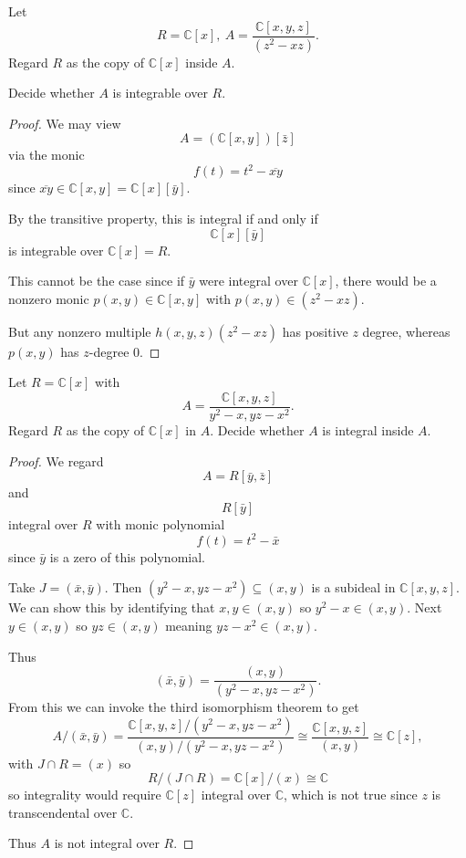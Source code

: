 \documentclass[11pt]{article}
\begin{document}
\begin{prob}
    Let 
    \[
        R = \mathbb C[x], \ A = 
        \frac{\mathbb C[x,y,z]}{(z^2-xz)}. 
    \]
    Regard $R$ as the copy of $\mathbb C[x]$ inside $A$. 
    
    Decide whether $A$ is integrable over $R$. 
\end{prob}
\begin{proof}
    We may view 
    \[
        A = (\mathbb C[x,y])[\bar z]
    \]
    via the monic 
    \[
        f(t) = t^2 - \overline{xy}
    \]
    since $\overline{xy} 
    \in \mathbb C[x,y] = \mathbb C[x][\bar y]$.
    
    By the transitive property, this is integral if 
    and only if 
    \[
        \mathbb C[x][\bar y] 
    \]
    is integrable over $\mathbb C[x] = R$. 

    This cannot be the case since if $\bar y$ 
    were integral over $\mathbb C[x]$, 
    there would be a nonzero monic $p(x,y) \in 
    \mathbb C[x,y]$ with 
    $p(x,y) \in (z^2 - xz)$. 

    But any nonzero multiple $h(x,y,z)(z^2-xz)$ 
    has positive $z$ degree, whereas 
    $p(x,y)$ has $z$-degree $0$. 
\end{proof}

\begin{prob}
    Let $R = \mathbb C[x]$ with 
    \[
        A = \frac{\mathbb C[x,y,z]}{y^2 - x, yz - x^2}. 
    \]
    Regard $R$ as the copy of $\mathbb C[x]$ in 
    $A$. 
    Decide whether $A$ is integral inside $A$. 
\end{prob}
\begin{proof}
    We regard 
    \[
        A = R[\bar y,\bar z] 
    \]
    and 
    \[
        R[\bar y]
    \]
    integral over $R$ with monic polynomial 
    \[
        f(t) = t^2 - \bar x 
    \]
    since $\bar y$ is a zero of this polynomial. 

    Take $J = (\bar x, \bar y)$. 
    Then $(y^2 - x, yz - x^2) \subseteq (x,y)$ is a 
    subideal in $\mathbb C[x,y,z]$. 
    We can show this by identifying that 
    $x, y \in (x,y)$ so $y^2 - x \in (x,y)$. 
    Next $y \in (x,y)$ so $yz \in (x,y)$ meaning 
    $yz - x^2 \in (x,y)$. 

    Thus 
    \[
        (\bar x, \bar y) = 
        \frac{(x,y)}{(y^2 - x, yz - x^2)}. 
    \]
    From this we can invoke the third isomorphism theorem to 
    get 
    \[
        A/(\bar x, \bar y) 
        = \frac{\mathbb C[x,y,z]/(y^2 - x, yz - x^2)}{(x,y)/(y^2 - x, yz - x^2)}
        \cong \frac{\mathbb C[x,y,z]}{(x,y)} \cong \mathbb C[z], 
    \]
    with $J \cap R = (x)$ so 
    \[
        R/(J \cap R) = \mathbb C[x]/(x) \cong \mathbb C 
    \]
    so integrality would require 
    $\mathbb C[z]$ integral over $\mathbb C$, which is 
    not true since $z$ is transcendental over $\mathbb C$. 

    Thus $A$ is not integral over $R$. 
\end{proof}
\end{document}
